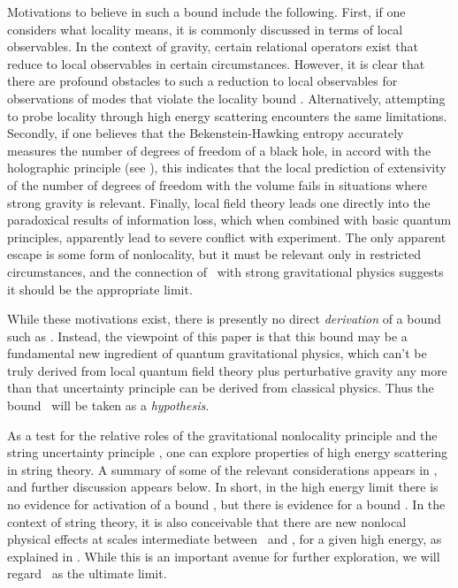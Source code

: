 Motivations to believe in such a bound include the following.  First, if one considers what locality means, it is commonly discussed in terms of local observables.  In the context of gravity, certain relational operators exist that reduce to local observables in certain circumstances.  However, it is clear that there are profound obstacles to such a reduction to local observables for observations of modes that violate the locality bound \gravbd.  Alternatively, attempting to probe locality through high energy scattering encounters the same limitations\LQGST.
Secondly, if one believes that the Bekenstein-Hawking entropy accurately measures the number of degrees of freedom of a black hole, in accord with the holographic principle (see ), this indicates that the local prediction of extensivity of the number of degrees of freedom with  the volume fails in situations where strong gravity is relevant.  Finally, local field theory leads one directly into the paradoxical results of information loss, which when combined with basic quantum principles, apparently lead to severe conflict with experiment.  The only apparent escape is some form of nonlocality, but it must be relevant only in restricted circumstances, and the connection of \gravbd\ with strong gravitational physics suggests it should be the appropriate limit.  

While these motivations exist, there is presently no direct {\it derivation} of a bound such as \gravbd.  Instead, the viewpoint of this paper is that this bound may be a fundamental new ingredient of quantum gravitational physics, which can't be truly derived from local quantum field theory plus perturbative gravity any more than that uncertainty principle can be derived from classical physics.  Thus the bound \gravbd\ will be taken as a {\it hypothesis}.

As a test for the relative roles of the gravitational nonlocality principle and the string uncertainty principle \genunc, one can explore properties of high energy scattering in string theory.  A summary of some of the relevant considerations appears in \LQGST, and further discussion appears below.  In short, in the high energy limit there is no evidence for activation of a bound \genunc, but there is evidence for a bound \gravbd.  In the context of string theory, it is also conceivable that there are new nonlocal physical effects at scales intermediate between \genunc\ and \gravbd, for a given high energy, as explained in \LQGST.   While this is an important avenue for further exploration, we will regard \gravbd\ as the ultimate limit.

